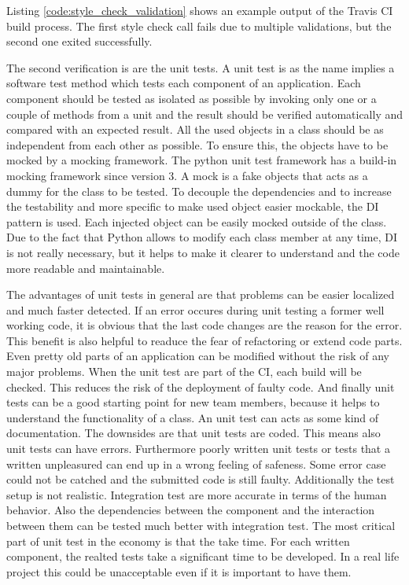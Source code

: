 Listing \ref{code:style_check_validation} shows an example output of the Travis \ac{CI} build process.
The first style check call fails due to multiple validations, but the second one exited successfully.\newline

The second verification is are the unit tests.
A unit test is as the name implies a software test method which tests each component of an application.
Each component should be tested as isolated as possible by invoking only one or a couple of methods from a unit and the result should be verified automatically and compared with an expected result.\autocite[cf.][p. 320]{Olan:2003:UTT:948785.948830}
All the used objects in a class should be as independent from each other as possible.
To ensure this, the objects have to be mocked by a mocking framework.
The python unit test framework has a build-in mocking framework since version 3.
A mock is a fake objects that acts as a dummy for the class to be tested.
To decouple the dependencies and to increase the testability and more specific to make used object easier mockable, the \ac{DI} pattern is used.
Each injected object can be easily mocked outside of the class.
Due to the fact that Python allows to modify each class member at any time, \ac{DI} is not really necessary, but it helps to make it clearer to understand and the code more readable and maintainable.\newline

The advantages of unit tests in general are that problems can be easier localized and much faster detected.
If an error occures during unit testing a former well working code, it is obvious that the last code changes are the reason for the error.
This benefit is also helpful to readuce the fear of refactoring or extend code parts.
Even pretty old parts of an application can be modified without the risk of any major problems.
When the unit test are part of the \ac{CI}, each build will be checked.
This reduces the risk of the deployment of faulty code.
And finally unit tests can be a good starting point for new team members, because it helps to understand the functionality of a class.
An unit test can acts as some kind of documentation.
The downsides are that unit tests are coded.
This means also unit tests can have errors.
Furthermore poorly written unit tests or tests that a written unpleasured can end up in a wrong feeling of safeness.
Some error case could not be catched and the submitted code is still faulty.
Additionally the test setup is not realistic.
Integration test are more accurate in terms of the human behavior.
Also the dependencies between the component and the interaction between them can be tested much better with integration test.
The most critical part of unit test in the economy is that the take time.
For each written component, the realted tests take a significant time to be developed.
In a real life project this could be unacceptable even if it is important to have them.\newline

